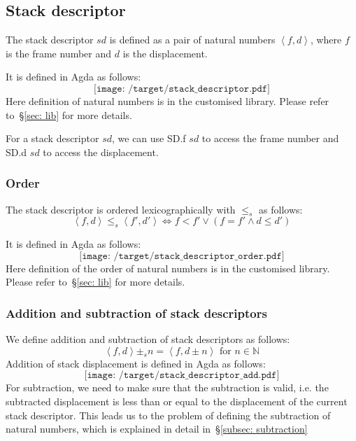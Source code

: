 \documentclass[12pt,a4paper]{report}
\theoremstyle{definition}
\newcommand{\secref}[1]{\S\ref{#1}}
\newcommand{\dpink}[1]{\textcolor{darkpink}{#1}}
\newcommand{\ang}[1]{\left\langle #1 \right\rangle}
\begin{document}
    \subsection{Stack descriptor}
    The stack descriptor $sd$ is defined as a pair of natural numbers $\ang{f, d}$, where $f$ is the frame number and $d$ is the displacement. 

    It is defined in Agda as follows:
    \[\texttt{[image: /target/stack\_descriptor.pdf]}\]
    Here definition of natural numbers is in the customised library. Please refer to~\secref{sec: lib} for more details.

    For a stack descriptor $sd$, we can use \dpink{SD.f} $sd$ to access the frame number and \dpink{SD.d} $sd$ to access the displacement. 

    \subsubsection{Order}
    The stack descriptor is ordered lexicographically with $\leq_s$ as follows:
    \[\ang{f, d} \leq_s \ang{f', d'} \Leftrightarrow f < f' \lor (f = f' \land d \leq d')\]

    It is defined in Agda as follows:
    \[\texttt{[image: /target/stack\_descriptor\_order.pdf]}\]
    Here definition of the order of natural numbers is in the customised library. Please refer to~\secref{sec: lib} for more details.

    \subsubsection{Addition and subtraction of stack descriptors}
    We define addition and subtraction of stack descriptors as follows:
    \[\ang{f, d} \pm_s n = \ang{f, d \pm n} \text{ for } n \in \mathbb{N}\]
    Addition of stack displacement is defined in Agda as follows:
    \[\texttt{[image: /target/stack\_descriptor\_add.pdf]}\]
    For subtraction, we need to make sure that the subtraction is valid, i.e. the subtracted displacement is less than or equal to the displacement of the current stack descriptor. This leads us to the problem of defining the subtraction of natural numbers, which is explained in detail in~\secref{subsec: subtraction}
\end{document}
